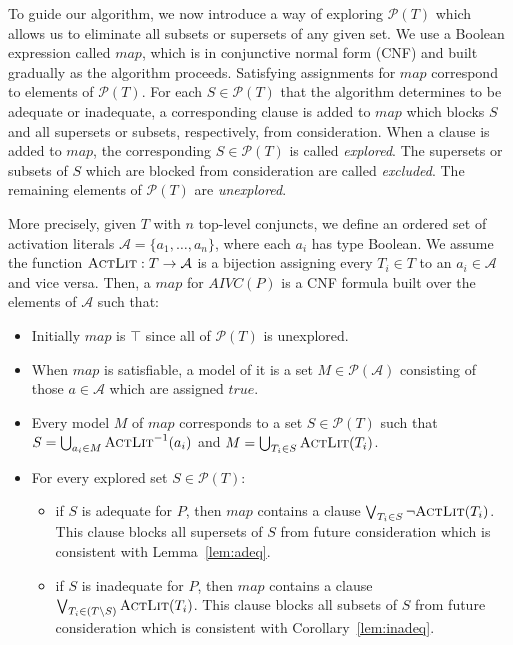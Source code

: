 To guide our algorithm, we now introduce a way of exploring
$\mathcal{P}(T)$ which allows us to eliminate all subsets or supersets
of any given set. We use a Boolean expression called $map$, which is
in conjunctive normal form (CNF) and built gradually as the algorithm
proceeds. Satisfying assignments for $map$ correspond to elements of
$\mathcal{P}(T)$. For each $S \in \mathcal{P}(T)$ that the algorithm
determines to be adequate or inadequate, a corresponding clause is
added to $map$ which blocks $S$ and all supersets or subsets,
respectively, from consideration. When a clause is added to $map$, the
corresponding $S \in \mathcal{P}(T)$ is called \emph{explored}.
The supersets or subsets of $S$ which are blocked from
consideration are called \emph{excluded}. The remaining elements
of $\mathcal{P}(T)$ are \emph{unexplored}.

More precisely, given $T$ with $n$ top-level conjuncts, we define an
ordered set of activation literals $\mathcal{A} = \{a_1, \ldots,
a_n\}$, where each $a_i$ has type Boolean. We assume the function
$\textsc{ActLit} : T \rightarrow \mathcal{A}$ is a bijection assigning every
$T_i \in T$ to an $a_i \in \mathcal{A}$ and vice versa. Then, a $map$
for $AIVC(P)$ is a CNF formula built over the elements of
$\mathcal{A}$ such that:
\begin{itemize}
  \item Initially $map$ is $\top$ since all of $\mathcal{P}(T)$ is unexplored.

  \item When $map$ is satisfiable, a model of it is a set
  $M \in \mathcal{P}(\mathcal{A})$ consisting of those $a \in
    \mathcal{A}$ which are assigned $true$.

  \item Every model $M$ of $map$ corresponds to a set $S \in \mathcal{P}(T)$ such that
$S = \bigcup_{a_i \in M} \textsc{ActLit} ^{-1} (a_i)$ and $M = \bigcup_{T_i \in S} \textsc{ActLit}(T_i)$.
\vspace{0.05in}
  \item For every explored set $S \in \mathcal{P}(T)$:
  \begin{itemize}
    \item if $S$ is adequate for $P$, then $map$ contains a clause
      $\bigvee_{T_{i}\in S} \neg {\textsc{ActLit}(T_i)}$. This clause blocks
      all supersets of $S$ from future consideration which is
      consistent with Lemma~\ref{lem:adeq}.

    \item if $S$ is inadequate for $P$, then $map$ contains a clause
      $\bigvee_{T_{i}\in (T \setminus S)} \textsc{ActLit} (T_i)$. This clause
      blocks all subsets of $S$ from future consideration which is
      consistent with Corollary~\ref{lem:inadeq}.
  \end{itemize}
\end{itemize}


